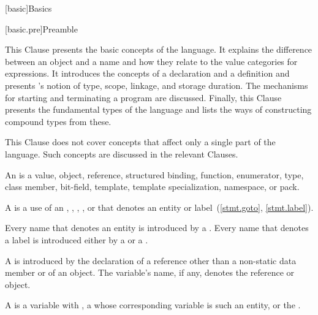 [basic]{Basics}


[basic.pre]{Preamble}

\pnum
\begin{note}
This Clause presents the basic concepts of the \Cpp{} language.
It explains the difference between an object and a
name and how they relate to the value categories for expressions.
It introduces the concepts of a
declaration and a definition and presents \Cpp{}'s
notion of type, scope, linkage, and
storage duration. The mechanisms for starting and
terminating a program are discussed. Finally, this Clause presents the
fundamental types of the language and lists the ways of constructing
compound types from these.
\end{note}

\pnum
\begin{note}
This Clause does not cover concepts that affect only a single
part of the language. Such concepts are discussed in the relevant
Clauses.
\end{note}

\pnum
{}%
%
%
%
%
%
An  is a value, object, reference,
structured binding,
function, enumerator, type,
class member, bit-field, template, template specialization, namespace, or
pack.

\pnum
A  is a use of an ,
,
,
, or
 that denotes an entity or
label~(\ref{stmt.goto}, \ref{stmt.label}).

\pnum
Every name that denotes an entity is introduced by a
. Every name that denotes a label is introduced
either by a  or a
.

\pnum
A  is introduced by the
declaration of
a reference other than a non-static data member or of
an object. The variable's name, if any, denotes the reference or object.

\pnum
A  is a variable with
,
a 
whose corresponding variable is such an entity,
or the .

